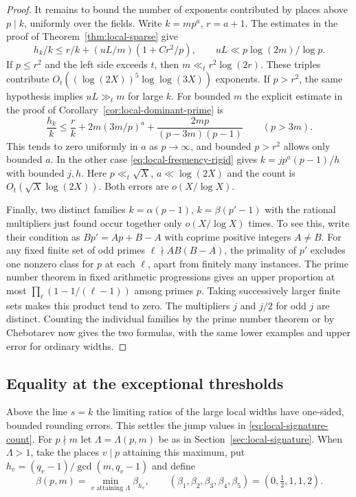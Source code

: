 \documentclass[11pt,letterpaper]{article}
\theoremstyle{definition}
\numberwithin{equation}{section}
\begin{document}
\begin{proof}
It remains to bound the number of exponents contributed by places
above $p\mid k$, uniformly over the fields. Write $k=mp^a$, $r=a+1$.
The estimates in the proof of Theorem~\ref{thm:local-sparse} give
\[
  h_k/k\le r/k+(uL/m)(1+Cr^2/p),\qquad
                   uL\ll p\log(2m)/\log p .
\]
If $p\le r^2$ and the left side exceeds $t$, then
$m\ll_t r^2\log(2r)$. These triples contribute
$O_t((\log(2X))^5\log\log(3X))$ exponents. If $p>r^2$, the same
hypothesis implies $uL\gg_t m$ for large $k$. For bounded $m$ the
explicit estimate in the proof of Corollary~\ref{cor:local-dominant-prime}
is
\[
 \frac{h_k}{k}\le\frac r k+2m(3m/p)^a+
                         \frac{2mp}{(p-3m)(p-1)}\qquad(p>3m).
\]
This tends to zero uniformly in $a$ as $p\to\infty$, and bounded
$p>r^2$ allows only bounded $a$. In the other case
\eqref{eq:local-frequency-rigid} gives $k=jp^a(p-1)/h$ with
bounded $j,h$. Here $p\ll_t\sqrt X$, $a\ll\log(2X)$ and the count
is $O_t(\sqrt X\log(2X))$. Both errors are $o(X/\log X)$.

Finally, two distinct families $k=\alpha(p-1)$, $k=\beta(p'-1)$
with the rational multipliers just found occur together only
$o(X/\log X)$ times. To see this, write their condition as
$B p'=A p+B-A$ with coprime positive integers $A\ne B$.
For any fixed finite set of odd primes $\ell\nmid AB(B-A)$, the
primality of $p'$ excludes one nonzero class for $p$ at each
$\ell$, apart from finitely many instances. The prime number theorem
in fixed arithmetic progressions gives an upper proportion at most
$\prod_\ell(1-1/(\ell-1))$ among primes $p$. Taking successively
larger finite sets makes this product tend to zero. The multipliers
$j$ and $j/2$ for odd $j$ are distinct. Counting the individual
families by the prime number theorem or by Chebotarev now gives
the two formulas, with the same lower examples and upper error for
ordinary widths.
\end{proof}

\subsection{Equality at the exceptional thresholds}
\label{sec:local-frequency-jumps}
Above the line $s=k$ the limiting ratios of the large local widths
have one-sided, bounded rounding errors. This settles the jump values
in \eqref{eq:local-signature-count}. For $p\nmid m$ let
$\Lambda=\Lambda(p,m)$ be as in Section~\ref{sec:local-signature}.
When $\Lambda>1$, take the places $v\mid p$ attaining this maximum,
put $h_v=(q_v-1)/\gcd(m,q_v-1)$ and define
\[
 \beta(p,m)=\min_{v\text{ attaining }\Lambda}\beta_{h_v},\qquad
 (\beta_1,\beta_2,\beta_3,\beta_4,\beta_5)
                 =(0,\tfrac12,1,1,2).
\]
\end{document}
